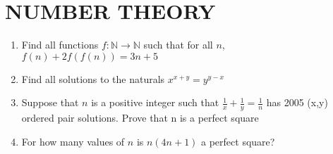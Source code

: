 \documentclass[12pt]{article}
\begin{document}
\section{NUMBER THEORY}
\begin{enumerate}
      \item Find all functions $f: \mathbb{N} \rightarrow \mathbb{N}$ such that for all $n$, $f(n) + 2f(f(n)) = 3n + 5$
      \item Find all solutions to the naturals $x^{x+y} = y^{y-x}$
      \item Suppose that $n$ is a positive integer such that $\frac{1}{x} + \frac{1}{y} = \frac{1}{n}$ has 2005 (x,y) ordered pair solutions. Prove that n is a perfect square
      \item For how many values of $n$ is $n(4n+1)$ a perfect square?
\end{enumerate}

\end{document}
